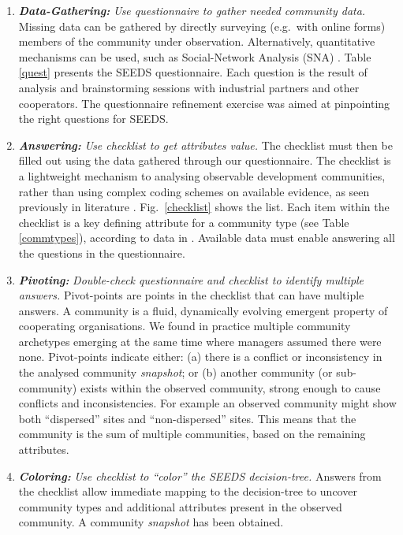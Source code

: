 \begin{enumerate}

\item \emph{\bf Data-Gathering:} \emph{Use questionnaire to gather needed community data.}
Missing data can be gathered by directly surveying (e.g.~with online forms) members of the community under observation. Alternatively, quantitative mechanisms can be used, such as Social-Network Analysis (SNA) \cite{Rosso2009}. Table \ref{quest} presents the SEEDS questionnaire. Each question is the result of analysis and brainstorming sessions with industrial partners and other cooperators. The questionnaire refinement exercise was aimed at pinpointing the right questions for SEEDS.

\item \emph{\bf Answering:} \emph{Use checklist to get attributes value.}
The checklist must then be filled out using the data gathered through our questionnaire. The checklist is a lightweight mechanism to analysing observable development communities, rather than using complex coding schemes on available evidence, as seen previously in literature \cite{Rosso2009,Hustad2010}. Fig.~\ref{checklist} shows the list. Each item within the checklist is a key defining attribute for a community type (see Table \ref{commtypes}), according to data in \cite{ossslr}. Available data must enable answering all the questions in the questionnaire.

\item \emph{\bf Pivoting:} \emph{Double-check questionnaire and checklist to identify multiple answers.}
Pivot-points are points in the checklist that can have multiple answers. A community is a fluid, dynamically evolving emergent property of cooperating organisations. We found in practice multiple community archetypes emerging at the same time where managers assumed there were none. Pivot-points indicate either: (a) there is a conflict or inconsistency in the analysed community \emph{snapshot}; or (b) another community (or sub-community) exists within the observed community, strong enough to cause conflicts and inconsistencies. For example an observed community might show both ``dispersed'' sites and ``non-dispersed'' sites. This means that the community is the sum of multiple communities, based on the remaining attributes.

\item \emph{\bf Coloring:} \emph{Use checklist to ``color'' the SEEDS decision-tree.}
Answers from the checklist allow immediate mapping to the decision-tree to uncover community types and additional attributes present in the observed community. A community \emph{snapshot} has been obtained.


\end{enumerate}
